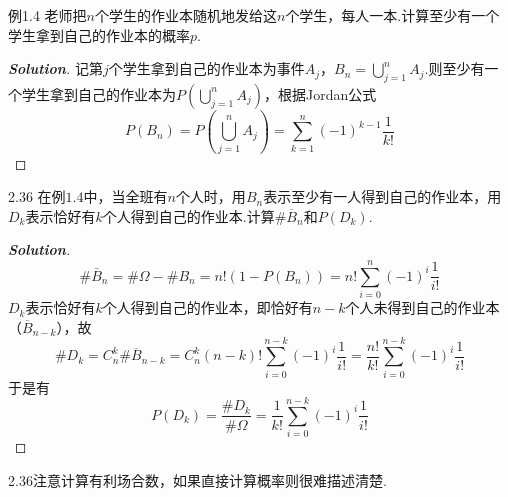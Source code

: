 \documentclass[10pt, a4paper, oneside]{ctexart}
\newenvironment{solution}{\begin{proof}[\bf Solution]}{\end{proof}}
\begin{document}
\newpage
例1.4 老师把$n$个学生的作业本随机地发给这$n$个学生，每人一本.计算至少有一个学生拿到自己的作业本的概率$p$.
\begin{solution}
记第$j$个学生拿到自己的作业本为事件$A_j$，$B_n=\bigcup\limits_{j = 1}^n {{A_j}}$.则至少有一个学生拿到自己的作业本为$P(\bigcup\limits_{j = 1}^n {{A_j}} )$，根据Jordan公式
\[P({B_n}) = P(\bigcup\limits_{j = 1}^n {{A_j}} ) = \sum\limits_{k = 1}^n {{{( - 1)}^{k - 1}}\frac{1}{{k!}}} \]
\end{solution}

2.36 在例$1.4$中，当全班有$n$个人时，用$B_n$表示至少有一人得到自己的作业本，用$D_k$表示恰好有$k$个人得到自己的作业本.计算$\#\overline{B}_n$和$P(D_k)$.
\begin{solution}
\[\# {{\bar B}_n} = \# \Omega  - \# {B_n} = n!(1 - P({B_n})) = n!\sum\limits_{i = 0}^n {{{( - 1)}^i}\frac{1}{{i!}}} \]
$D_k$表示恰好有$k$个人得到自己的作业本，即恰好有$n-k$个人未得到自己的作业本（$\overline{B}_{n-k}$），故
\[\# {D_k} = C_n^k\# {\overline B _{n - k}} = C_n^k(n - k)!\sum\limits_{i = 0}^{n - k} {{{( - 1)}^i}\frac{1}{{i!}}}  = \frac{{n!}}{{k!}}\sum\limits_{i = 0}^{n - k} {{{( - 1)}^i}\frac{1}{{i!}}} \]
于是有
\[P({D_k}) = \frac{{\# {D_k}}}{{\# \Omega }} = \frac{1}{{k!}}\sum\limits_{i = 0}^{n - k} {{{( - 1)}^i}\frac{1}{{i!}}} \]
\end{solution}
\begin{remark}
2.36注意计算有利场合数，如果直接计算概率则很难描述清楚.
\end{remark}

\newpage
\end{document}
